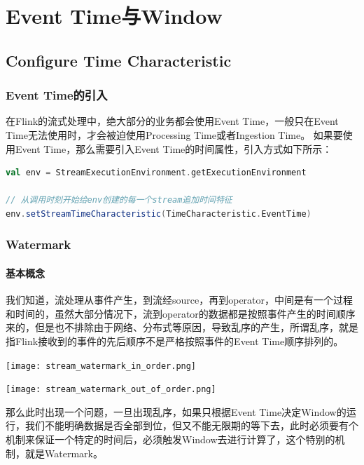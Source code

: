 \documentclass[oneside]{ctexbook}
\begin{document}
\chapter{Event Time与Window}

\section{Configure Time Characteristic}

\subsection{Event Time的引入}

在Flink的流式处理中，绝大部分的业务都会使用Event Time，一般只在Event Time无法使用时，才会被迫使用Processing Time或者Ingestion Time。
如果要使用Event Time，那么需要引入Event Time的时间属性，引入方式如下所示：

\begin{lstlisting}[language=scala]
val env = StreamExecutionEnvironment.getExecutionEnvironment
 
// 从调用时刻开始给env创建的每一个stream追加时间特征
env.setStreamTimeCharacteristic(TimeCharacteristic.EventTime)
\end{lstlisting}

\subsection{Watermark}

\subsubsection{基本概念}

我们知道，流处理从事件产生，到流经source，再到operator，中间是有一个过程和时间的，虽然大部分情况下，流到operator的数据都是按照事件产生的时间顺序来的，但是也不排除由于网络、分布式等原因，导致乱序的产生，所谓乱序，就是指Flink接收到的事件的先后顺序不是严格按照事件的Event Time顺序排列的。

\noindent \texttt{[image: stream\_watermark\_in\_order.png]}

\noindent \texttt{[image: stream\_watermark\_out\_of\_order.png]}

那么此时出现一个问题，一旦出现乱序，如果只根据Event Time决定Window的运行，我们不能明确数据是否全部到位，但又不能无限期的等下去，此时必须要有个机制来保证一个特定的时间后，必须触发Window去进行计算了，这个特别的机制，就是Watermark。
\end{document}
